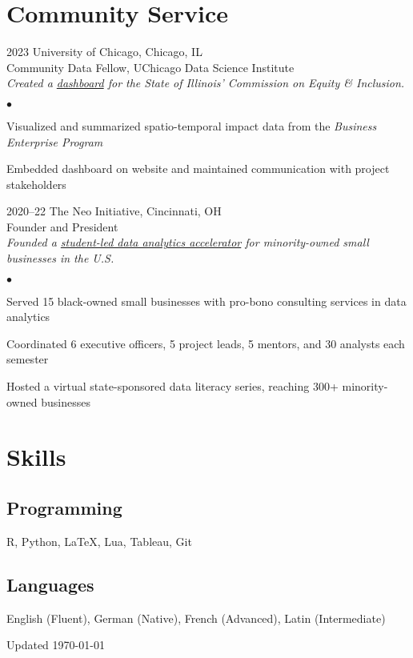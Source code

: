 \documentclass[11pt,letterpaper]{report}
\newenvironment{list2}{
  \begin{list}{\tiny$\bullet$}{%
      \setlength{\itemsep}{0in}
      \setlength{\parsep}{0in} \setlength{\parskip}{0in}
      \setlength{\topsep}{0in} \setlength{\partopsep}{0in} 
      \setlength{\leftmargin}{0.2in}}}{\end{list}}
\begin{document}
\section*{Community Service}

\begin{tablist}
\item[2023] \tab{}University of Chicago, Chicago, IL\\ 
Community Data Fellow, UChicago Data Science Institute\\  
\emph{Created a \href{https://public.tableau.com/app/profile/daniel.posmik/viz/DSI_CEI_Dashboard_draft/Dashboard1}{dashboard} for the State of Illinois' Commission on Equity \& Inclusion.}

\vspace*{.05in}  
\begin{list2}
\item Visualized and summarized spatio-temporal impact data from the \textit{Business Enterprise Program}
\item Embedded dashboard on website and maintained communication with project stakeholders
\end{list2}

\item[2020--22] \tab{}The Neo Initiative, Cincinnati, OH\\ 
Founder and President\\  
\emph{Founded a \href{https://www.linkedin.com/company/neo-initiative/}{student-led data analytics accelerator} for minority-owned small businesses in the U.S.} 

\vspace*{.05in}  
\begin{list2}
\item Served 15 black-owned small businesses with pro-bono consulting services in data analytics
\item Coordinated 6 executive officers, 5 project leads, 5 mentors, and 30 analysts each semester
\item Hosted a virtual state-sponsored data literacy series, reaching 300+ minority-owned businesses
\end{list2}
\end{tablist}

\section*{Skills}

\subsection*{Programming}
R, Python, LaTeX, Lua, Tableau, Git 

\subsection*{Languages}
English (Fluent), German (Native), French (Advanced), Latin (Intermediate)\\

\begin{center}
  \vfill
  Updated \monthyeardate\today
\end{center}
\end{document}
